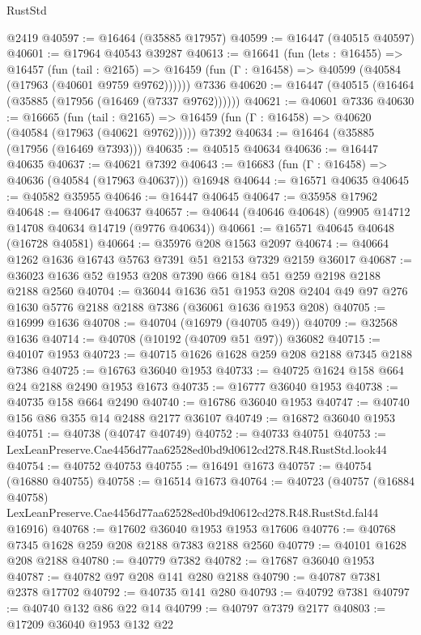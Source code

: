 \begin{lexlean}{RustStd}
\begin{coremodule}
    @2419
@40597 := @16464 (@35885 @17957)
@40599 := @16447 (@40515 @40597)
@40601 := @17964 @40543 @39287
@40613 := @16641
    (fun (lets : @16455) =>
    @16457
      (fun (tail : @2165) =>
      @16459 (fun (Γ : @16458) => @40599 (@40584 (@17963 (@40601 @9759 @9762))))))
    @7336
@40620 := @16447 (@40515 (@16464 (@35885 (@17956 (@16469 (@7337 @9762))))))
@40621 := @40601 @7336
@40630 := @16665
    (fun (tail : @2165) => @16459 (fun (Γ : @16458) => @40620 (@40584 (@17963 (@40621 @9762)))))
    @7392
@40634 := @16464 (@35885 (@17956 (@16469 @7393)))
@40635 := @40515 @40634
@40636 := @16447 @40635
@40637 := @40621 @7392
@40643 := @16683 (fun (Γ : @16458) => @40636 (@40584 (@17963 @40637))) @16948
@40644 := @16571 @40635
@40645 := @40582 @35955
@40646 := @16447 @40645
@40647 := @35958 @17962
@40648 := @40647 @40637
@40657 := @40644 (@40646 @40648) (@9905 @14712 @14708 @40634 @14719 (@9776 @40634))
@40661 := @16571 @40645 @40648 (@16728 @40581)
@40664 := @35976 @208 @1563 @2097
@40674 := @40664 @1262 @1636 @16743 @5763 @7391 @51 @2153 @7329 @2159 @36017
@40687 := @36023 @1636 @52 @1953 @208 @7390 @66 @184 @51 @259 @2198 @2188 @2188 @2560
@40704 := @36044
    @1636
    @51
    @1953
    @208
    @2404
    @49
    @97
    @276
    @1630
    @5776
    @2188
    @2188
    @7386
    (@36061 @1636 @1953 @208)
@40705 := @16999 @1636
@40708 := @40704 (@16979 (@40705 @49))
@40709 := @32568 @1636
@40714 := @40708 (@10192 (@40709 @51 @97)) @36082
@40715 := @40107 @1953
@40723 := @40715 @1626 @1628 @259 @208 @2188 @7345 @2188 @7386
@40725 := @16763 @36040 @1953
@40733 := @40725 @1624 @158 @664 @24 @2188 @2490 @1953 @1673
@40735 := @16777 @36040 @1953
@40738 := @40735 @158 @664 @2490
@40740 := @16786 @36040 @1953
@40747 := @40740 @156 @86 @355 @14 @2488 @2177 @36107
@40749 := @16872 @36040 @1953
@40751 := @40738 (@40747 @40749)
@40752 := @40733 @40751
@40753 := LexLeanPreserve.Cae4456d77aa62528ed0bd9d0612cd278.R48.RustStd.look44
@40754 := @40752 @40753
@40755 := @16491 @1673
@40757 := @40754 (@16880 @40755)
@40758 := @16514 @1673
@40764 := @40723
    (@40757
      (@16884 @40758)
      LexLeanPreserve.Cae4456d77aa62528ed0bd9d0612cd278.R48.RustStd.fal44
      @16916)
@40768 := @17602 @36040 @1953 @1953 @17606
@40776 := @40768 @7345 @1628 @259 @208 @2188 @7383 @2188 @2560
@40779 := @40101 @1628 @208 @2188
@40780 := @40779 @7382
@40782 := @17687 @36040 @1953
@40787 := @40782 @97 @208 @141 @280 @2188
@40790 := @40787 @7381 @2378 @17702
@40792 := @40735 @141 @280
@40793 := @40792 @7381
@40797 := @40740 @132 @86 @22 @14
@40799 := @40797 @7379 @2177
@40803 := @17209 @36040 @1953 @132 @22

\end{coremodule}
\end{lexlean}

